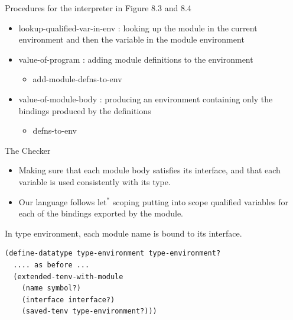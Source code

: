 \documentclass{article}
\begin{document}
\begin{huge}
Procedures for the interpreter in Figure 8.3 and 8.4
\begin{itemize}
\item lookup-qualified-var-in-env : looking up the module 
in the current environment and then the variable in the module environment
\item value-of-program : adding module definitions to the environment
\begin{itemize}
\item add-module-defns-to-env
\end{itemize}
\item value-of-module-body : producing an environment containing only the bindings
produced by the definitions
\begin{itemize}
\item defns-to-env
\end{itemize}
\end{itemize}


The Checker
\begin{itemize}
\item Making sure that each module body satisfies its interface, and that each
variable is used consistently with its type.
\item Our language follows let$^*$ scoping putting into scope qualified variables for each of the bindings exported by the module.
\end{itemize}



In type environment, each module name is bound to its interface.

\begin{lstlisting}[language=Lisp]
(define-datatype type-environment type-environment?
  .... as before ...
  (extended-tenv-with-module 
    (name symbol?)
    (interface interface?)
    (saved-tenv type-environment?)))
\end{lstlisting}



\end{huge}
\end{document}
